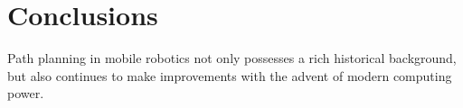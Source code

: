 \section{Conclusions}

Path planning in mobile robotics not only possesses a rich historical background, but also continues to make improvements with the advent of modern computing power. 
